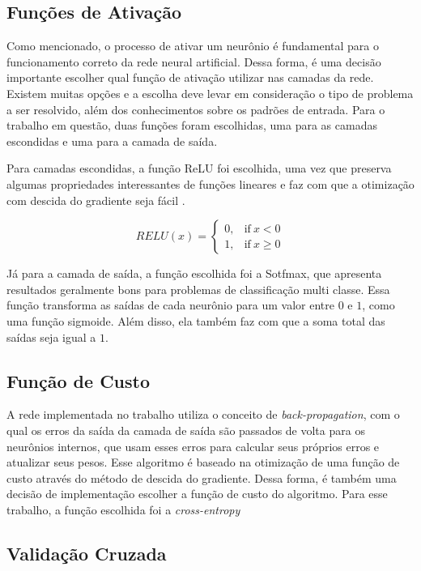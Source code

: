 \documentclass[12pt]{article}
\begin{document}
\subsection{Funções de Ativação}

Como mencionado, o processo de ativar um neurônio é fundamental para o
funcionamento correto da rede neural artificial. Dessa forma, é uma
decisão importante escolher qual função de ativação utilizar nas camadas
da rede. Existem muitas opções e a escolha deve levar em consideração
o tipo de problema a ser resolvido, além dos conhecimentos sobre os 
padrões de entrada\cite{principe2000neural}. Para o trabalho em questão, duas funções foram escolhidas, uma para as camadas escondidas e uma
para a camada de saída.

Para camadas escondidas, a função ReLU foi escolhida, uma vez que
preserva algumas propriedades interessantes de funções lineares e
faz com que a otimização com descida do gradiente seja fácil
\cite{Goodfellow-et-al-2016}.

\begin{equation}
	RELU(x) = 
	\begin{cases}
		0, & \text{if} ~ x < 0 \\
		1, & \text{if} ~ x \geq 0
	\end{cases}
\end{equation}

Já para a camada de saída, a função escolhida foi a Sotfmax, que 
apresenta resultados geralmente bons para problemas de classificação
multi classe. Essa função transforma as saídas de cada neurônio
para um valor entre $ 0 $ e $ 1 $, como uma função sigmoide. Além
disso, ela também faz com que a soma total das saídas seja igual a 
$ 1 $.

\subsection{Função de Custo}

A rede implementada no trabalho utiliza o conceito de
\textit{back-propagation}, com o qual os erros da saída da camada
de saída são passados de volta para os neurônios internos, que usam
esses erros para calcular seus próprios erros e atualizar seus pesos.
Esse algoritmo é baseado na otimização de uma função de custo através
do método de descida do gradiente. Dessa forma, é também uma decisão
de implementação escolher a função de custo do algoritmo. Para esse
trabalho, a função escolhida foi a \textit{cross-entropy}

\subsection{Validação Cruzada}
\end{document}
